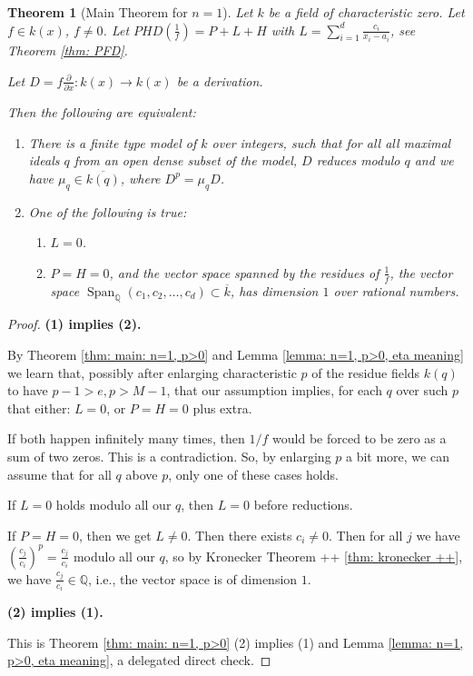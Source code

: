 \documentclass{amsart}
\newcommand{\op}{\operatorname}
\newtheorem{thm}{Theorem}[section]
\theoremstyle{definition}
\begin{document}
\begin{thm}[Main Theorem for $n=1$]\label{thm: main: n=1}
    Let $k$ be a field of characteristic zero. 
    Let $f\in k(x)$, $f\ne 0$. 
    Let $PHD(\frac{1}{f})=P+L+H$ with ${L}=\sum_{i=1}^d \frac{c_i}{x_i-a_i}$, see Theorem \ref{thm: PFD}.
    
    Let $D=f\frac{\partial}{\partial x}:k(x) \to k(x)$ be a derivation. 

    Then the following are equivalent:
    \begin{enumerate}
        \item There is a finite type model of $k$ over integers, such that for all all maximal ideals $q$ from an open dense subset of the model, $D$ reduces modulo $q$ and we have $\mu_q\in \overline{k(q)}$, where $D^p=\mu_q D$.
        \item One of the following is true:
        \begin{enumerate}
            \item $L=0$.
            \item $P=H=0$, and the vector space spanned by the residues of $\frac{1}{f}$, the vector space $\op{Span}_\mathbb{Q}(c_1,c_2,\ldots,c_d)\subset \overline{k}$, has dimension $1$ over rational numbers.
        \end{enumerate}
    \end{enumerate}
\end{thm}

\begin{proof} 

    \textbf{(1) implies (2).}

    By Theorem \ref{thm: main: n=1, p>0} and Lemma \ref{lemma: n=1, p>0, eta meaning} we learn that, possibly after enlarging characteristic $p$ of the residue fields $k(q)$ to have $p-1>e,p>M-1$, that our assumption implies, for each $q$ over such $p$ that either: $L=0$, or $P=H=0$ plus extra.

    If both happen infinitely many times, then $1/f$ would be forced to be zero as a sum of two zeros. This is a contradiction.
    So, by enlarging $p$ a bit more, we can assume that for all $q$ above $p$, only one of these cases holds.

    If $L=0$ holds modulo all our $q$, then $L=0$ before reductions.

    If $P=H=0$, then we get $L\ne 0$. Then there exists $c_i\ne 0$. Then for all $j$ we have $\left(\frac{c_j}{c_i}\right)^p=\frac{c_j}{c_i}$ modulo all our $q$, so by Kronecker Theorem ++ \ref{thm: kronecker ++}, we have $\frac{c_j}{c_i}\in \mathbb{Q}$, i.e., the vector space is of dimension $1$.

    \textbf{(2) implies (1).} 
    
    This is Theorem \ref{thm: main: n=1, p>0} (2) implies (1) and Lemma \ref{lemma: n=1, p>0, eta meaning}, a delegated direct check.
\end{proof}
\end{document}
